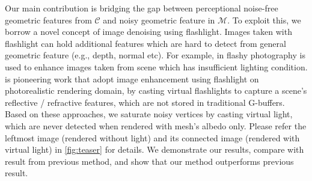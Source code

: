 Our main contribution is bridging the gap between perceptional noise-free geometric features from $\mathcal{C}$ and noisy geometric feature in $\mathcal{M}$. 
To exploit this, we borrow a novel concept of image denoising using flashlight. Images taken with flashlight can hold additional features which are hard to detect from general geometric feature (e.g., depth, normal etc). 
For example, in \cite{eisemann2004flash} \cite{petschnigg2004digital} flashy photography is used to enhance images taken from scene which has insufficient lighting condition. 
\cite{moon2013robust} is pioneering work that adopt image enhancement using flashlight on photorealistic rendering domain, by casting virtual flashlights to capture a scene’s reflective / refractive features, which are not stored in traditional G-buffers. 
Based on these approaches, we saturate noisy vertices by casting virtual light, which are never detected when rendered with mesh’s albedo only. 
Please refer the leftmost image (rendered without light) and its connected image (rendered with virtual light) in \ref{fig:teaser} for details. 
We demonstrate our results, compare with result from previous method, and show that our method outperforms previous result.